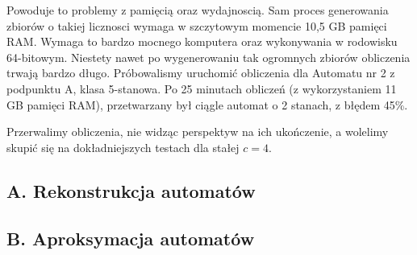 \documentclass{../llncs_template_final/llncs}
\begin{document}
Powoduje to problemy z pamięcią oraz wydajnoscią. Sam proces generowania zbiorów o takiej licznosci wymaga w szczytowym momencie 10,5 GB pamięci RAM. Wymaga to bardzo mocnego komputera oraz wykonywania w rodowisku 64-bitowym.
Niestety nawet po wygenerowaniu tak ogromnych zbiorów obliczenia trwają bardzo długo. Próbowalismy uruchomić obliczenia dla Automatu nr 2 z podpunktu A, klasa 5-stanowa. Po 25 minutach obliczeń (z wykorzystaniem 11 GB pamięci RAM), przetwarzany był ciągle automat o 2 stanach, z błędem 45\%. 

Przerwalimy obliczenia, nie widząc perspektyw na ich ukończenie, a wolelimy skupić się na dokładniejszych testach dla stałej $c = 4$.

\subsection{A. Rekonstrukcja automatów}

\subsection{B. Aproksymacja automatów}
\end{document}
